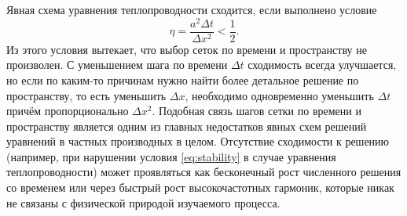\documentclass[12pt]{article}
\begin{document}
Явная схема уравнения теплопроводности сходится, если выполнено условие
%
\begin{equation}
\eta=\frac{a^2\Delta t}{\Delta x^2}<\frac{1}{2}.
\label{eq:stability}
\end{equation}
%
Из этого условия вытекает, что выбор сеток по времени и пространству не произволен. С уменьшением шага по времени $\Delta t$ сходимость всегда улучшается, но если по каким-то причинам нужно найти более детальное решение по пространству, то есть уменьшить $\Delta x$, необходимо одновременно уменьшить $\Delta t$ причём пропорционально $\Delta x^2$. Подобная связь шагов сетки по времени и пространству является одним из главных недостатков явных схем решений уравнений в частных производных в целом. Отсутствие сходимости к решению (например, при нарушении условия \eqref{eq:stability} в случае уравнения теплопроводности) может проявляться как бесконечный рост численного решения со временем или через быстрый рост высокочастотных гармоник, которые никак не связаны с физической природой изучаемого процесса.
\end{document}
